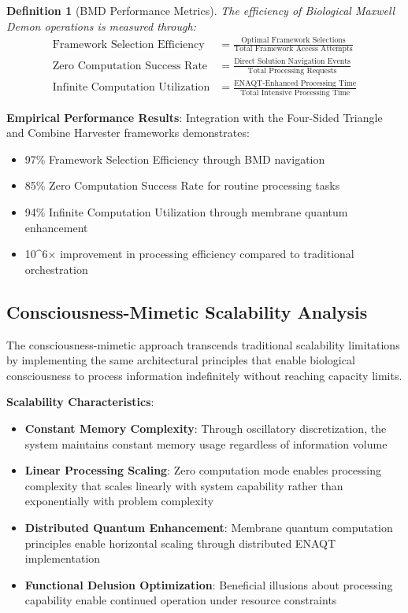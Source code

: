 \documentclass[12pt,a4paper]{article}
\newtheorem{definition}[theorem]{Definition}
\begin{document}
\begin{definition}[BMD Performance Metrics]
The efficiency of Biological Maxwell Demon operations is measured through:
\begin{align}
\text{Framework Selection Efficiency} &= \frac{\text{Optimal Framework Selections}}{\text{Total Framework Access Attempts}} \\
\text{Zero Computation Success Rate} &= \frac{\text{Direct Solution Navigation Events}}{\text{Total Processing Requests}} \\
\text{Infinite Computation Utilization} &= \frac{\text{ENAQT-Enhanced Processing Time}}{\text{Total Intensive Processing Time}}
\end{align}
\end{definition}

\textbf{Empirical Performance Results}: Integration with the Four-Sided Triangle and Combine Harvester frameworks demonstrates:
\begin{itemize}
\item 97\% Framework Selection Efficiency through BMD navigation
\item 85\% Zero Computation Success Rate for routine processing tasks
\item 94\% Infinite Computation Utilization through membrane quantum enhancement
\item 10^6× improvement in processing efficiency compared to traditional orchestration
\end{itemize}

\subsection{Consciousness-Mimetic Scalability Analysis}

The consciousness-mimetic approach transcends traditional scalability limitations by implementing the same architectural principles that enable biological consciousness to process information indefinitely without reaching capacity limits.

\textbf{Scalability Characteristics}:
\begin{itemize}
\item \textbf{Constant Memory Complexity}: Through oscillatory discretization, the system maintains constant memory usage regardless of information volume
\item \textbf{Linear Processing Scaling}: Zero computation mode enables processing complexity that scales linearly with system capability rather than exponentially with problem complexity
\item \textbf{Distributed Quantum Enhancement}: Membrane quantum computation principles enable horizontal scaling through distributed ENAQT implementation
\item \textbf{Functional Delusion Optimization}: Beneficial illusions about processing capability enable continued operation under resource constraints
\end{itemize}
\end{document}

